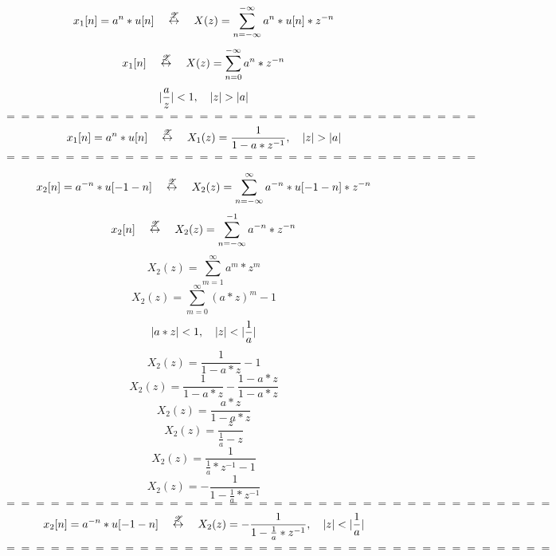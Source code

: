 \begin{Udledninger}
\begin{underrubrik}
        \[x_1[n] = a^n*u[n] \quad\overset{\mathscr{Z}}{\leftrightarrow}\quad X(z) = \sum_{n=-\infty}^{-\infty}  {a^n*u[n]*z^{-n}} \]
        \[x_1[n] \quad\overset{\mathscr{Z}}{\leftrightarrow}\quad X(z) = \sum_{n=0}^{-\infty}                        {a^n*z^{-n}} \]
        \[|\frac{a}{z}| < 1, \quad |z| > |a|                                                         \]
        \[================================                                                          \]
        \[x_1[n] = a^n*u[n] \quad\overset{\mathscr{Z}}{\leftrightarrow}\quad X_1(z) = \frac{1}{1 - a*z^{-1}}, \quad |z| > |a|      \]
        \[================================                                                          \]
    \end{underrubrik}
    \begin{underrubrik}
        \[x_2[n] = a^{-n}*u[-1-n] \quad\overset{\mathscr{Z}}{\leftrightarrow}\quad X_2(z) = \sum_{n=-\infty}^{\infty} {a^{-n}*u[-1-n]*z^{-n}}                     \]
        \[x_2[n] \quad\overset{\mathscr{Z}}{\leftrightarrow}\quad X_2(z) = \sum_{n=-\infty}^{-1}                      {a^{-n}*z^{-n}}                             \]
        \[X_2(z) = \sum_{m = 1}^{\infty}                                                {a^{m}*z^{m}}                               \]
        \[X_2(z) = \sum_{m = 0}^{\infty}                                                {(a*z)^m}                                - 1\]
        \[|a*z| < 1, \quad |z| < |\frac{1}{a}|                                                                                       \]
        \[X_2(z) = \frac{1}{1 - a*z} - 1                                                                                            \]
        \[X_2(z) = \frac{1}{1 - a*z} - \frac{1 - a*z}{1 - a*z}                                                                      \]
        \[X_2(z) = \frac{a*z}{1 - a*z}                                                                                              \]
        \[X_2(z) = \frac{z}{\frac{1}{a} - z}                                                                                        \]
        \[X_2(z) = \frac{1}{\frac{1}{a}*z^{-1} - 1}                                                                                 \]
        \[X_2(z) = -\frac{1}{1 - \frac{1}{a}*z^{-1}}                                                                                \]
        \[=====================================                                                                                     \]
        \[x_2[n] = a^{-n}*u[-1-n] \quad\overset{\mathscr{Z}}{\leftrightarrow}\quad X_2(z) = -\frac{1}{1 - \frac{1}{a}*z^{-1}}, \quad |z| < |\frac{1}{a}|           \]
        \[=====================================                                                                                     \]


\end{underrubrik}
\end{Udledninger}
